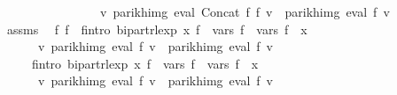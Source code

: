 \begin{isabellebody}
\ \ \ \ \ \ \ \ \ \ \ \ \ \ \ \ {\isacharparenleft}{\kern0pt}{\isasymforall}v{\isachardot}{\kern0pt}\ parikh{\isacharunderscore}{\kern0pt}img\ {\isacharparenleft}{\kern0pt}eval\ {\isacharparenleft}{\kern0pt}Concat\ f{}\ f{}{\isacharparenright}{\kern0pt}\ v{\isacharparenright}{\kern0pt}\ {\isacharequal}{\kern0pt}\ parikh{\isacharunderscore}{\kern0pt}img\ {\isacharparenleft}{\kern0pt}eval\ f{\isacharprime}{\kern0pt}\ v{\isacharparenright}{\kern0pt}{\isacharparenright}{\kern0pt}{\isachardoublequoteclose}\isanewline
%
\isadelimproof
%
\endisadelimproof
%
\isatagproof
{}\isamarkupfalse%
\ {\isacharminus}{\kern0pt}\isanewline
\ \ \isamarkupfalse%
\ assms\ \isamarkupfalse%
\ f{}{\isacharprime}{\kern0pt}\ f{}{\isacharprime}{\kern0pt}\ \ f{}{\isacharprime}{\kern0pt}{\isacharunderscore}{\kern0pt}intro{\isacharcolon}{\kern0pt}\ {\isachardoublequoteopen}bipart{\isacharunderscore}{\kern0pt}rlexp\ x\ f{}{\isacharprime}{\kern0pt}\ {\isasymand}\ vars\ f{}{\isacharprime}{\kern0pt}\ {\isacharequal}{\kern0pt}\ vars\ f{}\ {\isasymunion}\ {\isacharbraceleft}{\kern0pt}x{\isacharbraceright}{\kern0pt}\ {\isasymand}\isanewline
\ \ \ \ \ \ {\isacharparenleft}{\kern0pt}{\isasymforall}v{\isachardot}{\kern0pt}\ parikh{\isacharunderscore}{\kern0pt}img\ {\isacharparenleft}{\kern0pt}eval\ f{}\ v{\isacharparenright}{\kern0pt}\ {\isacharequal}{\kern0pt}\ parikh{\isacharunderscore}{\kern0pt}img\ {\isacharparenleft}{\kern0pt}eval\ f{}{\isacharprime}{\kern0pt}\ v{\isacharparenright}{\kern0pt}{\isacharparenright}{\kern0pt}{\isachardoublequoteclose}\isanewline
\ \ \ \ \ f{}{\isacharprime}{\kern0pt}{\isacharunderscore}{\kern0pt}intro{\isacharcolon}{\kern0pt}\ {\isachardoublequoteopen}bipart{\isacharunderscore}{\kern0pt}rlexp\ x\ f{}{\isacharprime}{\kern0pt}\ {\isasymand}\ vars\ f{}{\isacharprime}{\kern0pt}\ {\isacharequal}{\kern0pt}\ vars\ f{}\ {\isasymunion}\ {\isacharbraceleft}{\kern0pt}x{\isacharbraceright}{\kern0pt}\ {\isasymand}\isanewline
\ \ \ \ \ \ {\isacharparenleft}{\kern0pt}{\isasymforall}v{\isachardot}{\kern0pt}\ parikh{\isacharunderscore}{\kern0pt}img\ {\isacharparenleft}{\kern0pt}eval\ f{}\ v{\isacharparenright}{\kern0pt}\ {\isacharequal}{\kern0pt}\ parikh{\isacharunderscore}{\kern0pt}img\ {\isacharparenleft}{\kern0pt}eval\ f{}{\isacharprime}{\kern0pt}\ v{\isacharparenright}{\kern0pt}{\isacharparenright}{\kern0pt}{\isachardoublequoteclose}\isanewline

\end{isabellebody}

